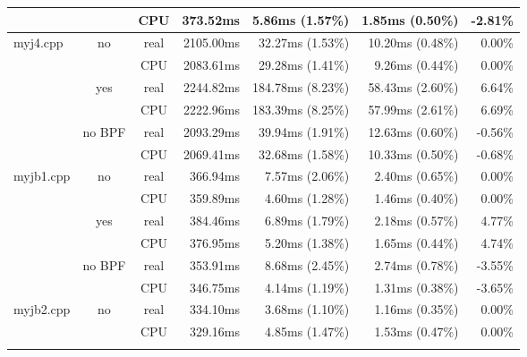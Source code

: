 \documentclass[en]{pracamgr}
\begin{document}
\begin{appendices}
\begin{small}
\begin{longtable}{|l|c|c|r|r|r|r|}
                            &                         & CPU  & 373.52ms & 5.86ms (1.57\%) & 1.85ms (0.50\%) & -2.81\% \\
\hline
\multirow{6}{*}{myj4.cpp}   & \multirow{2}{*}{no}     & real & 2105.00ms & 32.27ms (1.53\%) & 10.20ms (0.48\%) & 0.00\% \\*
                            &                         & CPU  & 2083.61ms & 29.28ms (1.41\%) & 9.26ms (0.44\%) & 0.00\% \\*
                            \cline{2-7}
                            & \multirow{2}{*}{yes}    & real & 2244.82ms & 184.78ms (8.23\%) & 58.43ms (2.60\%) & 6.64\% \\*
                            &                         & CPU  & 2222.96ms & 183.39ms (8.25\%) & 57.99ms (2.61\%) & 6.69\% \\*
                            \cline{2-7}
                            & \multirow{2}{*}{no BPF} & real & 2093.29ms & 39.94ms (1.91\%) & 12.63ms (0.60\%) & -0.56\% \\*
                            &                         & CPU  & 2069.41ms & 32.68ms (1.58\%) & 10.33ms (0.50\%) & -0.68\% \\
\hline
\multirow{6}{*}{myjb1.cpp}  & \multirow{2}{*}{no}     & real & 366.94ms & 7.57ms (2.06\%) & 2.40ms (0.65\%) & 0.00\% \\*
                            &                         & CPU  & 359.89ms & 4.60ms (1.28\%) & 1.46ms (0.40\%) & 0.00\% \\*
                            \cline{2-7}
                            & \multirow{2}{*}{yes}    & real & 384.46ms & 6.89ms (1.79\%) & 2.18ms (0.57\%) & 4.77\% \\*
                            &                         & CPU  & 376.95ms & 5.20ms (1.38\%) & 1.65ms (0.44\%) & 4.74\% \\*
                            \cline{2-7}
                            & \multirow{2}{*}{no BPF} & real & 353.91ms & 8.68ms (2.45\%) & 2.74ms (0.78\%) & -3.55\% \\*
                            &                         & CPU  & 346.75ms & 4.14ms (1.19\%) & 1.31ms (0.38\%) & -3.65\% \\
\hline
\multirow{6}{*}{myjb2.cpp}  & \multirow{2}{*}{no}     & real & 334.10ms & 3.68ms (1.10\%) & 1.16ms (0.35\%) & 0.00\% \\*
                            &                         & CPU  & 329.16ms & 4.85ms (1.47\%) & 1.53ms (0.47\%) & 0.00\% \\*

\end{longtable}
\end{small}
\end{appendices}
\end{document}
